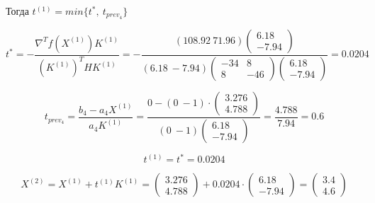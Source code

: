 Тогда $t^{(1)} = min\{t^*,\ t_{prev_4}\}$

\begin{equation*}
	t^* = -\frac{\nabla^T f(X^{(1)}) K^{(1)}}{(K^{(1)})^T H K^{(1)}} = -\frac{(108.92\  71.96) \begin{pmatrix} 6.18 \\ -7.94 \end{pmatrix}}{(6.18\ -7.94) \begin{pmatrix} -34 & 8 \\ 8 & -46 \end{pmatrix} \begin{pmatrix} 6.18 \\ -7.94 \end{pmatrix}} = 0.0204
\end{equation*}


\begin{equation*}
	t_{prev_4} = \frac{b_4 - a_4 X^{(1)}}{a_4 K^{(1)}} = \frac{0 - (0\ -1) \cdot \begin{pmatrix} 3.276 \\ 4.788 \end{pmatrix}}{(0\ -1) \begin{pmatrix} 6.18 \\ -7.94 \end{pmatrix}} = \frac{4.788}{7.94} = 0.6
\end{equation*}

\begin{equation*}
	t^{(1)} = t^* = 0.0204
\end{equation*}

\begin{equation*}
	X^{(2)} = X^{(1)} + t^{(1)} K^{(1)} = \begin{pmatrix}
		3.276 \\ 4.788
	\end{pmatrix}
	+
	0.0204 \cdot \begin{pmatrix} 6.18 \\ -7.94 \end{pmatrix}
	=
	\begin{pmatrix}
		3.4 \\ 4.6
	\end{pmatrix}
\end{equation*}

